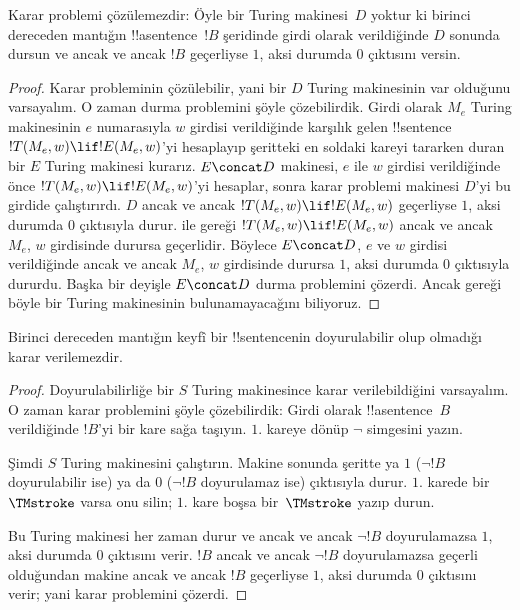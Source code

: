 


\begin{thm}
Karar problemi çözülemezdir: Öyle bir Turing makinesi~$D$ yoktur ki birinci
dereceden mantığın !!a{sentence}~$!B$ şeridinde girdi olarak verildiğinde
$D$ sonunda dursun ve ancak ve ancak $!B$ geçerliyse $1$, aksi durumda $0$
çıktısını versin.
\end{thm}

\begin{proof}
Karar probleminin çözülebilir, yani bir $D$ Turing makinesinin var olduğunu
varsayalım. O zaman durma problemini şöyle çözebilirdik. Girdi olarak $M_e$
Turing makinesinin $e$ numarasıyla $w$ girdisi verildiğinde karşılık gelen
!!{sentence}~$!T(M_e,w)\lif !E(M_e,w)$'yi hesaplayıp şeritteki en soldaki
kareyi tararken duran bir $E$ Turing makinesi kurarız. $E\concat D$ makinesi,
$e$ ile $w$ girdisi verildiğinde önce $!T(M_e,w)\lif !E(M_e,w)$'yi hesaplar,
sonra karar problemi makinesi $D$'yi bu girdide çalıştırırdı. $D$ ancak ve
ancak $!T(M_e,w)\lif !E(M_e,w)$ geçerliyse $1$, aksi durumda $0$ çıktısıyla
durur.  ile
 gereği $!T(M_e,w)\lif !E(M_e,w)$ ancak ve
ancak $M_e$, $w$ girdisinde durursa geçerlidir. Böylece $E\concat D$, $e$ ve
$w$ girdisi verildiğinde ancak ve ancak $M_e$, $w$ girdisinde durursa $1$,
aksi durumda $0$ çıktısıyla dururdu. Başka bir deyişle $E\concat D$ durma
problemini çözerdi. Ancak  gereği böyle bir
Turing makinesinin bulunamayacağını biliyoruz.
\end{proof}

\begin{cor}%
Birinci dereceden mantığın keyfî bir !!{sentence}{}nin doyurulabilir olup
olmadığı karar verilemezdir.
\end{cor}

\begin{proof}
  Doyurulabilirliğe bir $S$ Turing makinesince karar verilebildiğini
  varsayalım. O zaman karar problemini şöyle çözebilirdik: Girdi olarak
  !!a{sentence}~$B$ verildiğinde $!B$'yi bir kare sağa taşıyın. $1$. kareye
  dönüp $\lnot$ simgesini yazın.

  Şimdi $S$ Turing makinesini çalıştırın. Makine sonunda şeritte ya $1$
  ($\lnot !B$ doyurulabilir ise) ya da $0$ ($\lnot !B$ doyurulamaz ise)
  çıktısıyla durur. $1$. karede bir~$\TMstroke$ varsa onu silin; $1$. kare
  boşsa bir~$\TMstroke$ yazıp durun.

  Bu Turing makinesi her zaman durur ve ancak ve ancak $\lnot !B$
  doyurulamazsa $1$, aksi durumda $0$ çıktısını verir. $!B$ ancak ve ancak
  $\lnot !B$ doyurulamazsa geçerli olduğundan makine ancak ve ancak $!B$
  geçerliyse $1$, aksi durumda $0$ çıktısını verir; yani karar problemini
  çözerdi.
\end{proof}

